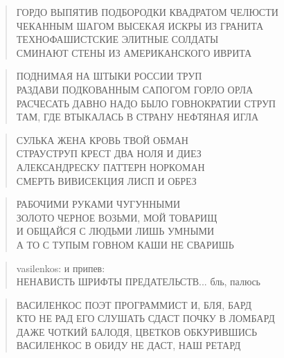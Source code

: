 \poemtitle{***}
\begin{verse}
ГОРДО ВЫПЯТИВ ПОДБОРОДКИ КВАДРАТОМ ЧЕЛЮСТИ\\
ЧЕКАННЫМ ШАГОМ ВЫСЕКАЯ ИСКРЫ ИЗ ГРАНИТА\\
ТЕХНОФАШИСТСКИЕ ЭЛИТНЫЕ СОЛДАТЫ \\
СМИНАЮТ СТЕНЫ ИЗ АМЕРИКАНСКОГО ИВРИТА
\end{verse}

\poemtitle{***}
\begin{verse}
ПОДНИМАЯ НА ШТЫКИ РОССИИ ТРУП\\
РАЗДАВИ ПОДКОВАННЫМ САПОГОМ ГОРЛО ОРЛА\\
РАСЧЕСАТЬ ДАВНО НАДО БЫЛО ГОВНОКРАТИИ СТРУП\\
ТАМ, ГДЕ ВТЫКАЛАСЬ В СТРАНУ НЕФТЯНАЯ ИГЛА
\end{verse}

\poemtitle{***}
\begin{verse}
СУЛЬКА ЖЕНА КРОВЬ ТВОЙ ОБМАН\\
СТРАУСТРУП КРЕСТ ДВА НОЛЯ И ДИЕЗ\\
АЛЕКСАНДРЕСКУ ПАТТЕРН НОРКОМАН\\
СМЕРТЬ ВИВИСЕКЦИЯ ЛИСП И ОБРЕЗ
\end{verse}

\poemtitle{***}
\begin{verse}
РАБОЧИМИ РУКАМИ ЧУГУННЫМИ\\
ЗОЛОТО ЧЕРНОЕ ВОЗЬМИ, МОЙ ТОВАРИЩ\\
И ОБЩАЙСЯ С ЛЮДЬМИ ЛИШЬ УМНЫМИ\\
А ТО С ТУПЫМ ГОВНОМ КАШИ НЕ СВАРИШЬ
\end{verse}

\poemtitle{***}
\begin{verse}
vasilenkos: и припев:\\
НЕНАВИСТЬ ШРИФТЫ ПРЕДАТЕЛЬСТВ... бль, палюсь
\end{verse}

\poemtitle{***}
\begin{verse}
ВАСИЛЕНКОС ПОЭТ ПРОГРАММИСТ И, БЛЯ, БАРД\\
КТО НЕ РАД ЕГО СЛУШАТЬ СДАСТ ПОЧКУ В ЛОМБАРД\\
ДАЖЕ ЧОТКИЙ БАЛОДЯ, ЦВЕТКОВ ОБКУРИВШИСЬ\\
ВАСИЛЕНКОС В ОБИДУ НЕ ДАСТ, НАШ РЕТАРД
\end{verse}

